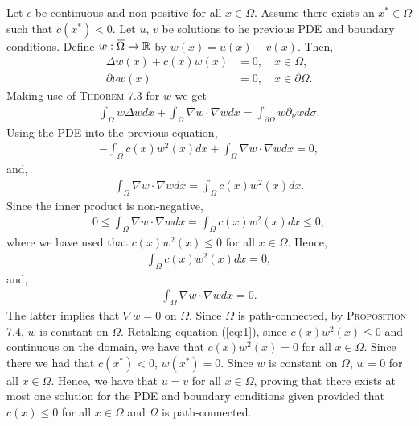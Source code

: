 \begin{questions}
\begin{solution}
Let $c$ be continuous and non-positive for all $x\in\Omega$. Assume there exists an $x^*\in\Omega$ such that $c(x^*)<0$. Let $u$, $v$ be solutions to he previous PDE and boundary conditions. Define $w:\overline{\Omega}\rightarrow\mathbb{R}$ by $w(x)=u(x)-v(x)$. Then,
\begin{align*}
\Delta w(x)+c(x)w(x)&=0,\quad x\in\Omega,\\
\partial\nu w(x)&=0,\quad x\in\partial\Omega.
\end{align*}
Making use of \textsc{Theorem 7.3} for $w$ we get
\begin{align*}
\int_{\Omega}w\Delta wdx+\int_{\Omega}\nabla w\cdot\nabla w dx=\int_{\partial\Omega}w\partial_{\nu}w d\sigma.
\end{align*}
Using the PDE into the previous equation,
\begin{align*}
-\int_{\Omega}c(x)w^2(x)dx+\int_{\Omega}\nabla w\cdot\nabla w dx=0,
\end{align*}
and,
\begin{align*}
\int_{\Omega}\nabla w\cdot\nabla w dx=\int_{\Omega}c(x)w^2(x)dx.
\end{align*}
Since the inner product is non-negative,
\begin{align*}
0\leq \int_{\Omega}\nabla w\cdot\nabla w dx=\int_{\Omega}c(x)w^2(x)dx\leq 0,
\end{align*}
where we have used that $c(x)w^2(x)\leq 0$ for all $x\in\Omega$. Hence,
\begin{align}
\int_{\Omega}c(x)w^2(x)dx= 0,
\end{align}\label{eq:1}
and,
\begin{align*}
\int_{\Omega}\nabla w\cdot\nabla w dx=0.
\end{align*}
The latter implies that $\nabla w=0$ on $\Omega$. Since $\Omega$ is path-connected, by \textsc{Proposition 7.4}, $w$ is constant on $\Omega$. Retaking equation (\ref{eq:1}), since $c(x)w^2(x)\leq 0$ and continuous on the domain, we have that $c(x)w^2(x)=0$ for all $x\in\Omega$. Since there we had that $c(x^*)<0$, $w(x^*)=0$. Since $w$ is constant on $\Omega$, $w=0$ for all $x\in\Omega$. Hence, we have that $u=v$ for all $x\in\Omega$, proving that there exists at most one solution for the PDE and boundary conditions given provided that $c(x)\leq 0$ for all $x\in\Omega$ and $\Omega$ is path-connected.
\end{solution}
\end{questions}
